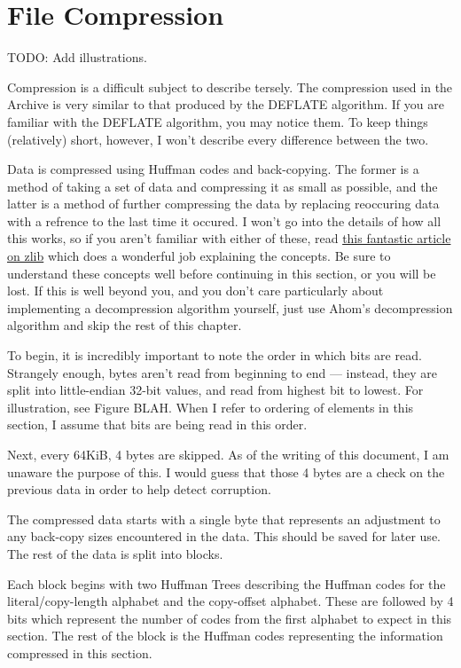 \section{File Compression}
\label{sec:filecompression}

TODO: Add illustrations.

Compression is a difficult subject to describe tersely.  The compression used in
the Archive is very similar to that produced by the DEFLATE algorithm.  If you
are familiar with the DEFLATE algorithm, you may notice them.  To keep things
(relatively) short, however, I won't describe every difference between the two.

Data is compressed using Huffman codes and back-copying.  The former is a method
of taking a set of data and compressing it as small as possible, and the latter
is a method of further compressing the data by replacing reoccuring data with a
refrence to the last time it occured.  I won't go into the details of how all
this works, so if you aren't familiar with either of these, read
\href{http://zlib.net/feldspar.html}{this fantastic article on zlib} which does
a wonderful job explaining the concepts.  Be sure to understand these concepts
well before continuing in this section, or you will be lost.  If this is well
beyond you, and you don't care particularly about implementing a decompression
algorithm yourself, just use Ahom's decompression algorithm and skip the rest
of this chapter.

To begin, it is incredibly important to note the order in which bits are read.
Strangely enough, bytes aren't read from beginning to end --- instead, they
are split into little-endian 32-bit values, and read from highest bit to lowest.
For illustration, see Figure BLAH.  When I refer to ordering of elements in this
section, I assume that bits are being read in this order.

Next, every 64KiB, 4 bytes are skipped.  As of the writing of this document, I
am unaware the purpose of this.  I would guess that those 4 bytes are a check
on the previous data in order to help detect corruption.

The compressed data starts with a single byte that represents an adjustment to
any back-copy sizes encountered in the data.  This should be saved for later
use.  The rest of the data is split into blocks.

Each block begins with two Huffman Trees describing the Huffman codes for the
literal/copy-length alphabet and the copy-offset alphabet. These are followed
by 4 bits which represent the number of codes from the first alphabet to expect
in this section. The rest of the block is the Huffman codes representing the
information compressed in this section.

